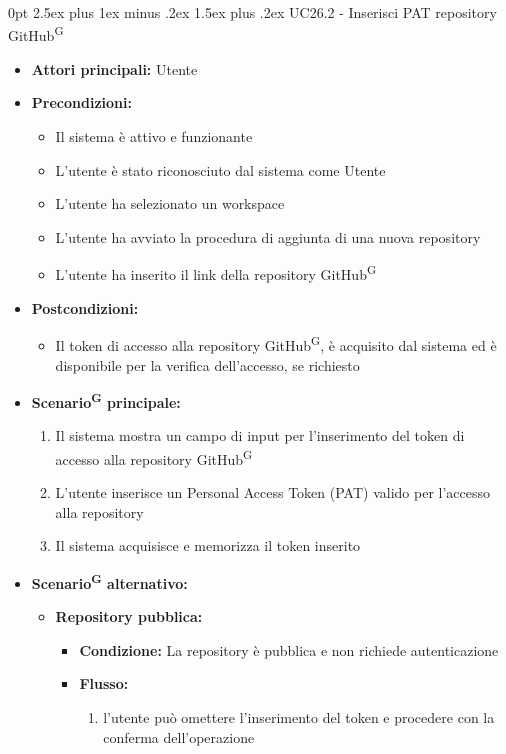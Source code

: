 \documentclass[a4paper, 11pt]{article}
\makeatletter
\renewcommand\paragraph{\@startsection{paragraph}{4}
  {0pt}
  {2.5ex plus 1ex minus .2ex}
  {1.5ex plus .2ex}
  {\normalfont\normalsize\bfseries\color{AccentDark}}}
\makeatother
\begin{document}
\paragraph{UC26.2 - Inserisci PAT repository GitHub\textsuperscript{G}}\label{UC26.2}
\begin{itemize}
	\item \textbf{Attori principali:} Utente
	\item \textbf{Precondizioni:} 
	\begin{itemize}
		\item Il sistema è attivo e funzionante
		\item L'utente è stato riconosciuto dal sistema come Utente
		\item L'utente ha selezionato un workspace
		\item L'utente ha avviato la procedura di aggiunta di una nuova repository
		\item L'utente ha inserito il link della repository GitHub\textsuperscript{G}
	\end{itemize}
	\item \textbf{Postcondizioni:} 
	\begin{itemize}
		\item Il token di accesso alla repository GitHub\textsuperscript{G}, è acquisito dal sistema ed è disponibile per la verifica dell'accesso, se richiesto
	\end{itemize}
	\item \textbf{Scenario\textsuperscript{G} principale:}
	\begin{enumerate}
		\item Il sistema mostra un campo di input per l'inserimento del token di accesso alla repository GitHub\textsuperscript{G}
		\item L'utente inserisce un Personal Access Token (PAT) valido per l'accesso alla repository
		\item Il sistema acquisisce e memorizza il token inserito
	\end{enumerate}
		\item \textbf{Scenario\textsuperscript{G} alternativo:}
	\begin{itemize}
		\item \textbf{Repository pubblica:} 
			\begin{itemize}
				\item \textbf{Condizione:} La repository è pubblica e non richiede autenticazione
				\item \textbf{Flusso:} 
				\begin{enumerate}
					\item l'utente può omettere l'inserimento del token e procedere con la conferma dell'operazione
				\end{enumerate}
			\end{itemize}
	\end{itemize}
\end{itemize}
\end{document}
